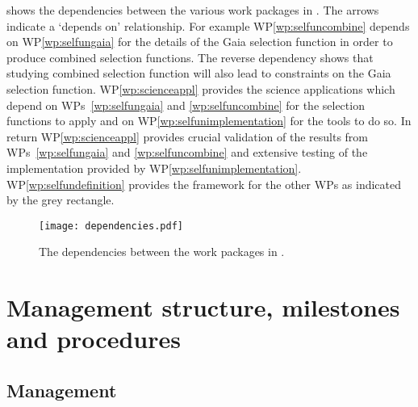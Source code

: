  shows the dependencies between the various work packages in \acro. The arrows indicate a ‘depends on’ relationship. For example WP\ref{wp:selfuncombine} depends on WP\ref{wp:selfungaia} for the details of the Gaia selection function in order to produce combined selection functions. The reverse dependency shows that studying combined selection function will also lead to constraints on the Gaia selection function. WP\ref{wp:scienceappl} provides the science applications which depend on WPs~\ref{wp:selfungaia} and \ref{wp:selfuncombine} for the selection functions to apply and on WP\ref{wp:selfunimplementation} for the tools to do so. In return WP\ref{wp:scienceappl} provides crucial validation of the results from WPs~\ref{wp:selfungaia} and \ref{wp:selfuncombine} and extensive testing of the implementation provided by WP\ref{wp:selfunimplementation}. WP\ref{wp:selfundefinition} provides the framework for the other WPs as indicated by the grey rectangle.

\begin{figure}
    \centering
    \texttt{[image: dependencies.pdf]}
    \caption{The dependencies between the work packages in \acro.}
    \label{fig:dependencies}
\end{figure}

\section{Management structure, milestones and procedures}
\label{sec:management}

\subsection{Management}
\label{sec:mgtdetails}

